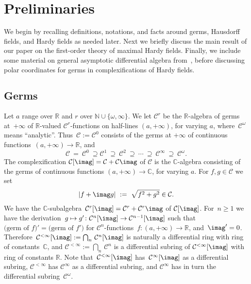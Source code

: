 \documentclass[]{amsart}
\numberwithin{equation}{section}
\newcommand{\bbold}{\mathbb}
\def\R { {\bbold R} }
\def\C { {\bbold C} }
\def\N { {\bbold N} }
\def\c {\mathcal{C}}
\theoremstyle{definition}
\theoremstyle{remark}
\renewcommand\geq{\geqslant}
\renewcommand\ge{\geq}
\def \Gr{\mathcal{C}^r}
\def \Gn{\mathcal{C}^n}
\def \Gi{\mathcal{C}^{<\infty}}
\def \Ginf{\mathcal{C}^{\infty}}
\def \Gom{\mathcal{C}^{\omega}}
\begin{document}
\section{Preliminaries}\label{sec:prelims}

\noindent
We begin by recalling definitions, notations, and facts around germs, Hausdorff fields, and Hardy fields  as needed later. Next we briefly discuss
the main result of our paper \cite{ADH2} on the first-order theory of maximal Hardy fields. Finally, we include some   material
on general asymptotic differential algebra from~\cite{ADH4}, before discussing polar coordinates for germs in complexifications of Hardy fields.

\subsection*{Germs}
Let $a$ range over $\R$ and $r$   over $\N\cup\{\omega,\infty\}$. We let $\c^r$ be  the $\R$-algebra of germs at~$+\infty$ of $\R$-valued $\c^r$-functions on half-lines $(a,+\infty)$, for varying $a$, where~$\c^\omega$  means ``analytic''. Thus~$\c:=\c^0$ consists of the germs
at $+\infty$ of continuous   functions~${(a,+\infty)\to\R}$, and
 $$ \c\ =\ \c^0 \ \supseteq \c^1 \ \supseteq\ \c^2  \ \supseteq\  \cdots  \ \supseteq\ \c^\infty  \ \supseteq\ \c^\omega.$$
 The complexification $\c[\imag]=\c+\c\imag$ of $\c$ is the $\C$-algebra consisting of the germs of continuous functions $(a,+\infty)\to\C$, for varying $a$. For $f,g\in \c$ we set $$|f+\imag g|\ :=\ \sqrt{f^2+g^2}\in \c.$$ 
We  have the  $\C$-sub\-al\-ge\-bra~$\Gr[\imag]=\Gr+\Gr\imag$ of $\c[\imag]$.
For~$n\ge 1$ we have the derivation~${g\mapsto g'\colon \Gn[\imag]\to\c^{n-1}[\imag]}$
such that $\text{(germ of $f$)}'=\text{(germ of $f'$)}$ for $\c^n$-functions~$f\colon (a,+\infty)\to\R$, and~${\imag'=0}$. %
Therefore~$\Gi[\imag]  := \bigcap_{n}\, \Gn[\imag]$ 
is naturally a differential ring with ring of constants~$\C$, and
$\Gi  := \bigcap_{n}\, \Gn$
is a differential subring of $\Gi[\imag]$ with ring of constants $\R$.
Note that~$\Gi[\imag]$ has~$\Ginf[\imag]$ as a differential subring, $\Gi$ has $\Ginf$ as a differential subring,
and  $\Ginf$ has in turn
the differential subring~$\Gom$.
\end{document}
